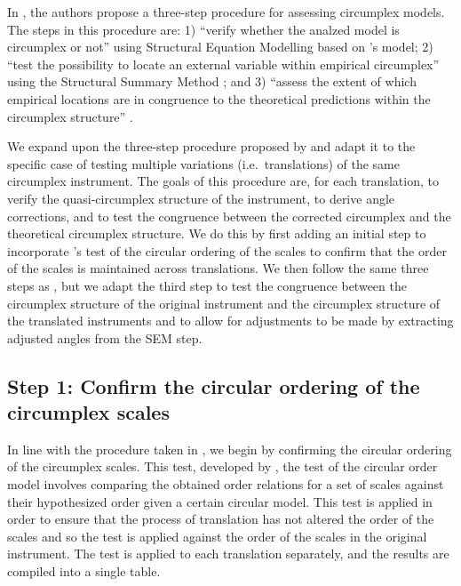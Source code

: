\documentclass[
  authoryear,
  preprint,
  3p]{elsarticle}
\begin{document}
In \citet{Rogoza2021three}, the authors propose a three-step procedure
for assessing circumplex models. The steps in this procedure are: 1)
``verify whether the analzed model is circumplex or not'' using
Structural Equation Modelling based on \citet{Browne1992Circumplex}'s
model; 2) ``test the possibility to locate an external variable within
empirical circumplex'' using the Structural Summary Method
\citep{Gurtman1994differentiating}; and 3) ``assess the extent of which
empirical locations are in congruence to the theoretical predictions
within the circumplex structure'' \citep{Rogoza2021three}.

We expand upon the three-step procedure proposed by
\citet{Rogoza2021three} and adapt it to the specific case of testing
multiple variations (i.e.~translations) of the same circumplex
instrument. The goals of this procedure are, for each translation, to
verify the quasi-circumplex structure of the instrument, to derive angle
corrections, and to test the congruence between the corrected circumplex
and the theoretical circumplex structure. We do this by first adding an
initial step to incorporate \citet{Rounds2000Tinsley}'s test of the
circular ordering of the scales to confirm that the order of the scales
is maintained across translations. We then follow the same three steps
as \citet{Rogoza2021three}, but we adapt the third step to test the
congruence between the circumplex structure of the original instrument
and the circumplex structure of the translated instruments and to allow
for adjustments to be made by extracting adjusted angles from the SEM
step.

\subsection{Step 1: Confirm the circular ordering of the circumplex
scales}\label{step-1-confirm-the-circular-ordering-of-the-circumplex-scales}

In line with the procedure taken in \citet{Gurtman2000Interpersonal}, we
begin by confirming the circular ordering of the circumplex scales. This
test, developed by \citet{Rounds2000Tinsley}, the test of the circular
order model involves comparing the obtained order relations for a set of
scales against their hypothesized order given a certain circular model.
This test is applied in order to ensure that the process of translation
has not altered the order of the scales and so the test is applied
against the order of the scales in the original instrument. The test is
applied to each translation separately, and the results are compiled
into a single table.
\end{document}
